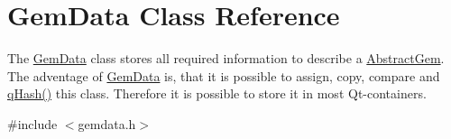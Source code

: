 \hypertarget{class_gem_data}{}\section{Gem\+Data Class Reference}
\label{class_gem_data}


The \hyperlink{class_gem_data}{Gem\+Data} class stores all required information to describe a \hyperlink{class_abstract_gem}{Abstract\+Gem}.  The adventage of \hyperlink{class_gem_data}{Gem\+Data} is, that it is possible to assign, copy, compare and \hyperlink{abstractgem_8cpp_a92fb5a3a6f53f07f0f9653dd299d31ff}{q\+Hash()} this class. Therefore it is possible to store it in most Qt-\/containers.  




{\ttfamily \#include $<$gemdata.\+h$>$}

